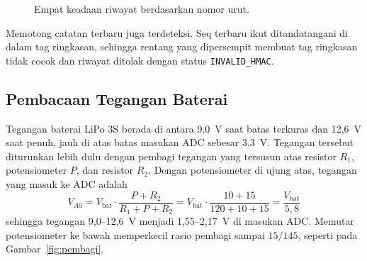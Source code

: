 \documentclass[11pt,a4paper]{article}
\begin{document}
\begin{figure}[H]
  \centering
  \caption{Empat keadaan riwayat berdasarkan nomor urut.}
  \label{fig:seq}
\end{figure}
Memotong catatan terbaru juga terdeteksi. Seq terbaru ikut ditandatangani di dalam tag
ringkasan, sehingga rentang yang dipersempit membuat tag ringkasan tidak cocok dan riwayat
ditolak dengan status \texttt{INVALID\_HMAC}.

\subsection{Pembacaan Tegangan Baterai}
\label{subsec:pembagi}

Tegangan baterai LiPo 3S berada di antara 9,0~V saat batas terkuras dan 12,6~V saat penuh,
jauh di atas batas masukan ADC sebesar 3,3~V. Tegangan tersebut diturunkan lebih dulu dengan
pembagi tegangan yang tersusun atas resistor $R_1$, potensiometer $P$, dan resistor $R_2$.
Dengan potensiometer di ujung atas, tegangan yang masuk ke ADC adalah
\begin{equation}
  V_{A0} = V_{\mathrm{bat}} \cdot \frac{P + R_2}{R_1 + P + R_2}
         = V_{\mathrm{bat}} \cdot \frac{10 + 15}{120 + 10 + 15}
         = \frac{V_{\mathrm{bat}}}{5{,}8}
  \label{eq:pembagi}
\end{equation}
sehingga tegangan 9,0--12,6~V menjadi 1,55--2,17~V di masukan ADC. Memutar potensiometer ke
bawah memperkecil rasio pembagi sampai $15/145$, seperti pada Gambar~\ref{fig:pembagi}.
\end{document}
